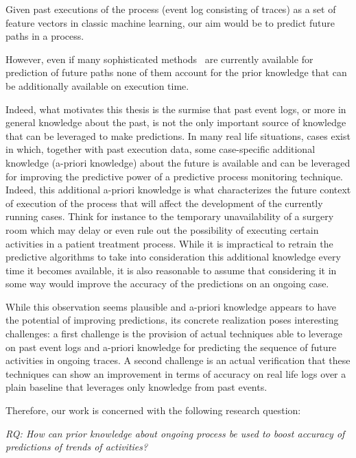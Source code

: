 Given past executions of the process (event log consisting of traces) as a set of feature vectors in classic machine learning, our aim would be to predict future paths in a process.

However, even if many sophisticated methods~\cite{evermann,Polatoetal:2016,niek96732} are currently available for prediction of future paths none of them account for the prior knowledge that can be additionally available on execution time. 

Indeed, what motivates this thesis is the surmise that past event logs, or more in general knowledge about the past, is not the only important source of knowledge that can be leveraged to make predictions. In many real life situations, cases exist in which, together with past execution data, some case-specific additional knowledge (a-priori knowledge) about the future is available and can be leveraged for improving the predictive power of a predictive process monitoring technique. Indeed, this additional a-priori knowledge is what characterizes the future context of execution of the process that will affect the development of the currently running cases. Think for instance to the temporary unavailability of a surgery room which may delay or even rule out the possibility of executing  certain activities in a patient treatment process. While it is impractical to retrain the predictive algorithms to take into consideration this additional knowledge every time it becomes available, it is also reasonable to assume that considering it in some way would improve the accuracy of the predictions on an ongoing case.

While this observation seems plausible and a-priori knowledge appears to have the potential of improving predictions, its concrete realization poses interesting challenges: a first challenge is the provision of actual techniques able to leverage on past event logs and a-priori knowledge for predicting the sequence of future activities in ongoing traces. A second challenge is an actual verification that these techniques can show an improvement in terms of accuracy on real life logs over a plain baseline that leverages only knowledge from past events.

Therefore, our work is concerned with the following research question:

\textit{RQ: How can prior knowledge about ongoing process be used to boost accuracy of predictions of trends of activities?}


